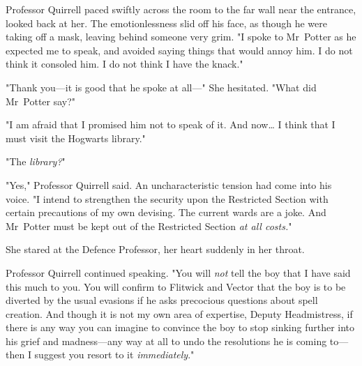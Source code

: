 Professor Quirrell paced swiftly across the room to the far wall near the
entrance, looked back at her. The emotionlessness slid off his face, as though
he were taking off a mask, leaving behind someone very grim. "I spoke to
Mr~Potter as he expected me to speak, and avoided saying things that would
annoy him. I do not think it consoled him. I do not think I have the knack."

"Thank you---it is good that he spoke at all---" She hesitated. "What did
Mr~Potter say?"

"I am afraid that I promised him not to speak of it. And now{\ldots} I think
that I must visit the Hogwarts library."

"The \emph{library?}"

"Yes," Professor Quirrell said. An uncharacteristic tension had come into his
voice. "I intend to strengthen the security upon the Restricted Section with
certain precautions of my own devising. The current wards are a joke. And
Mr~Potter must be kept out of the Restricted Section \emph{at all costs.}"

She stared at the Defence Professor, her heart suddenly in her throat.

Professor Quirrell continued speaking. "You will \emph{not} tell the boy that I
have said this much to you. You will confirm to Flitwick and Vector that the
boy is to be diverted by the usual evasions if he asks precocious questions
about spell creation. And though it is not my own area of expertise, Deputy
Headmistress, if there is any way you can imagine to convince the boy to stop
sinking further into his grief and madness---any way at all to undo the
resolutions he is coming to---then I suggest you resort to it
\emph{immediately}."
